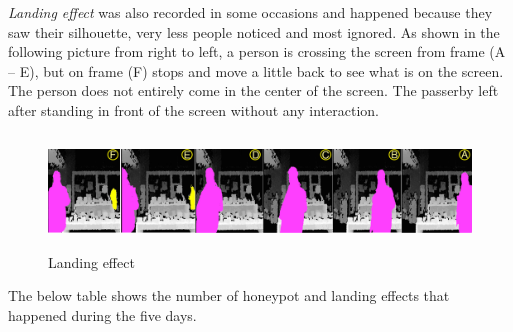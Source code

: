\emph{Landing effect} was also recorded in some occasions and happened because they saw their silhouette, very less people noticed and most ignored. As shown in the following picture from right to left, a person is crossing the screen from frame (A – E), but on frame (F) stops and move a little back to see what is on the screen. The person does not entirely come in the center of the screen. The passerby left after standing in front of the screen without any interaction.

\begin{minipage}{0.95\textwidth}
\begin{flushright}
\begin{figure}[H]
    \centering
    \includegraphics[width=\textwidth,height=30mm]{Figures/8/mobile_inter_findings/effects/landing}
    \caption{Landing effect}
    \label{fig:mobile_landingeffect}
\end{figure}
\end{flushright}
\end{minipage}


The below table shows the number of honeypot and landing effects that happened during the five days.

\begin{table}[H]
\caption{Mobile Interactive Landing and honeypot effect}
\label{tab:landingandhonypot_mobile}
\centering
{}
\end{table}



